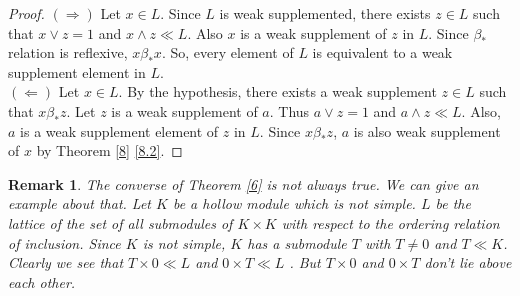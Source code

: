 \documentclass[a4paper,12pt]{article}
\newtheorem{remark}[theorem]{Remark}
\numberwithin{equation}{section}
\begin{document}
\begin{proof}
  $ ( \Rightarrow ) $ 
  Let $ x \in L $. Since $ L $ is weak supplemented, there exists $ z \in L $ such that 
  $ x \vee z = 1 $ and $ x \wedge z \ll L $. Also $ x $ is a weak supplement of $ z $ in $ L $. 
  Since $ \beta_* $ relation is reflexive, $ x \beta_* x $. So, every element of $ L $ is 
  equivalent to a weak supplement element in $ L $. \\
  $ ( \Leftarrow ) $
  Let $ x \in L $. By the hypothesis, there exists a weak supplement $ z \in L $ such that 
  $ x \beta_* z $. Let $ z $ is a weak supplement of $ a $. Thus $ a \vee z = 1 $ and $ a \wedge z \ll L $. 
  Also, $ a $ is a weak supplement element of $ z $ in $ L $. Since $ x \beta_* z $, 
  $ a $ is also weak supplement of $ x $ by Theorem \ref{8} \ref{8.2}.  
\end{proof}
\begin{remark}
  The converse of Theorem \ref{6} is not always true. We can give an example about that. Let $ K $ be a hollow module which is not simple. 
  $ L $ be the lattice of the set of all submodules of $ K \times K $ with respect to the ordering relation of inclusion. 
  Since $ K $ is not simple, $ K $ has a submodule $ T $ with $ T \neq 0 $ and $ T \ll K $. Clearly we see that $ T \times 0 \ll L $ and $ 0 \times T \ll L $ . 
  But $ T \times 0 $ and $ 0 \times T $ don't lie above each other.
\end{remark}


\cleardoublepage
\nocite{*}
\printbibliography[maxnames=99]
\end{document}
